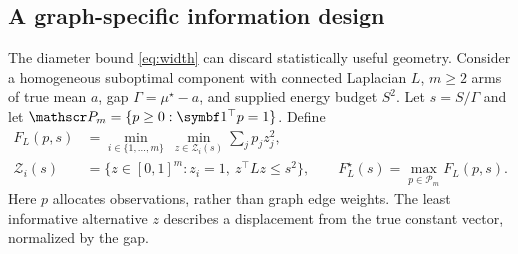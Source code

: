 \subsection{A graph-specific information design}
The diameter bound \eqref{eq:width} can discard statistically useful geometry. Consider a homogeneous suboptimal component with connected Laplacian $L$, $m\ge2$ arms of true mean $a$, gap $\Gamma=\mu^\star-a$, and supplied energy budget $S^2$. Let $s=S/\Gamma$ and let $\mathscr P_m=\{p\ge0:\one^\top p=1\}$. Define
\begin{align}
 F_L(p,s)&=\min_{i\in\{1,\ldots,m\}}\ \min_{z\in\mathcal Z_i(s)}
                 \sum_jp_jz_j^2,\label{eq:designF}\\
 \mathcal Z_i(s)&=\{z\in[0,1]^m:z_i=1,\ z^\top Lz\le s^2\},\qquad
 F_L^\star(s)=\max_{p\in\mathscr P_m}F_L(p,s).\nonumber
\end{align}
Here $p$ allocates observations, rather than graph edge weights. The least informative alternative $z$ describes a displacement from the true constant vector, normalized by the gap.

